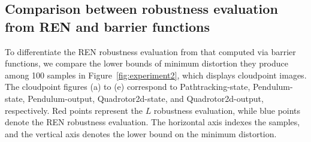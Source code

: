 \documentclass[conference]{IEEEtran}
\newcommand{\ren}{\textsc{REN}\xspace}
\begin{document}
\subsection{Comparison between robustness evaluation from \ren and barrier functions}\label{exam:efficiency}
To differentiate the \ren robustness evaluation 
from that computed via barrier functions, 
we compare the lower bounds of minimum distortion 
they produce among 100 samples 
in Figure~\ref{fig:experiment2}, 
which displays cloudpoint images.
The cloudpoint figures (a) to (e) correspond to 
Pathtracking-state, Pendulum-state, 
Pendulum-output, Quadrotor2d-state, and 
Quadrotor2d-output, respectively. 
Red points represent the $L$ robustness 
evaluation, while blue points denote 
the \ren robustness evaluation. The horizontal 
axis indexes the samples, and the vertical 
axis denotes the lower bound on the 
minimum distortion.
\end{document}

